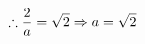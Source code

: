 \documentclass[preview]{standalone}
\begin{document}
\begin{align*}
\special{dvisvgm:raw <g id='unique000'>}\therefore \frac{2}{a}=\sqrt{2}\Rightarrow a=\sqrt{2}\special{dvisvgm:raw </g>}
\end{align*}
\end{document}

